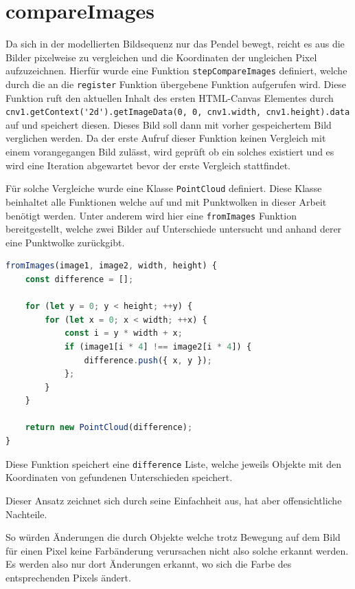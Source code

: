 \section{compareImages}

Da sich in der modellierten Bildsequenz nur das Pendel bewegt, reicht es aus die Bilder pixelweise zu vergleichen und die Koordinaten der ungleichen Pixel aufzuzeichnen.
Hierfür wurde eine Funktion \lstinline{stepCompareImages} definiert, welche durch die an die \lstinline{register} Funktion übergebene Funktion aufgerufen wird.
Diese Funktion ruft den aktuellen Inhalt des ersten HTML-Canvas Elementes durch \lstinline{cnv1.getContext('2d').getImageData(0, 0, cnv1.width, cnv1.height).data} auf und speichert diesen.
Dieses Bild soll dann mit vorher gespeichertem Bild verglichen werden.
Da der erste Aufruf dieser Funktion keinen Vergleich mit einem vorangegangen Bild zulässt, wird geprüft ob ein solches existiert und es wird eine Iteration abgewartet bevor der erste Vergleich stattfindet.

Für solche Vergleiche wurde eine Klasse \lstinline{PointCloud} definiert.
Diese Klasse beinhaltet alle Funktionen welche auf und mit Punktwolken in dieser Arbeit benötigt werden.
Unter anderem wird hier eine \lstinline{fromImages} Funktion bereitgestellt, welche zwei Bilder auf Unterschiede untersucht und anhand derer eine Punktwolke zurückgibt.

\begin{lstlisting}[language=JavaScript, caption={Definition der \lstinline{fromImages} Funktion, welche eine statische Funktion der \lstinline{PointCloud} Klasse darstellt.}, label={lst:PointCloud}]
fromImages(image1, image2, width, height) {
    const difference = [];

    for (let y = 0; y < height; ++y) {
        for (let x = 0; x < width; ++x) {
            const i = y * width + x;
            if (image1[i * 4] !== image2[i * 4]) {
                difference.push({ x, y });
            };
        }
    }

    return new PointCloud(difference);
}
\end{lstlisting}

Diese Funktion speichert eine \lstinline{difference} Liste, welche jeweils Objekte mit den Koordinaten von gefundenen Unterschieden speichert.

Dieser Ansatz zeichnet sich durch seine Einfachheit aus, hat aber offensichtliche Nachteile.

So würden Änderungen die durch Objekte welche trotz Bewegung auf dem Bild für einen Pixel keine Farbänderung verursachen nicht also solche erkannt werden.
Es werden also nur dort Änderungen erkannt, wo sich die Farbe des entsprechenden Pixels ändert.

